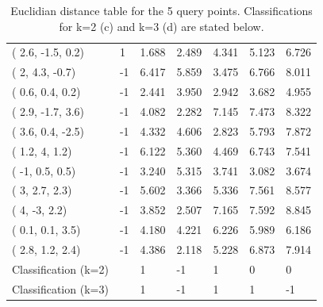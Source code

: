 \documentclass[12pt]{article}
\begin{document}
\begin{table}[h!]
\begin{tabular}{lllllll}
( 2.6, -1.5, 0.2)    & 1     & \cellcolor[HTML]{FFFE65}1.688 & \cellcolor[HTML]{FFCC67}2.489 & 4.341                         & 5.123                         & 6.726                         \\
( 2, 4.3, -0.7)      & -1    & 6.417                         & 5.859                         & 3.475                         & 6.766                         & 8.011                         \\
( 0.6, 0.4, 0.2)     & -1    & 2.441                         & 3.950                         & 2.942                         & 3.682                         & 4.955                         \\
( 2.9, -1.7, 3.6)    & -1    & 4.082                         & \cellcolor[HTML]{FFFE65}2.282 & 7.145                         & 7.473                         & 8.322                         \\
( 3.6, 0.4, -2.5)    & -1    & 4.332                         & 4.606                         & \cellcolor[HTML]{FFCC67}2.823 & 5.793                         & 7.872                         \\
( 1.2, 4, 1.2)       & -1    & 6.122                         & 5.360                         & 4.469                         & 6.743                         & 7.541                         \\
( -1, 0.5, 0.5)      & -1    & 3.240                         & 5.315                         & 3.741                         & 3.082                         & 3.674                         \\
( 3, 2.7, 2.3)       & -1    & 5.602                         & 3.366                         & 5.336                         & 7.561                         & 8.577                         \\
( 4, -3, 2.2)        & -1    & 3.852                         & 2.507                         & 7.165                         & 7.592                         & 8.845                         \\
( 0.1, 0.1, 3.5)     & -1    & 4.180                         & 4.221                         & 6.226                         & 5.989                         & 6.186                         \\
( 2.8, 1.2, 2.4)     & -1    & 4.386                         & \cellcolor[HTML]{FFFE65}2.118 & 5.228                         & 6.873                         & 7.914                         \\ \hline
Classification (k=2) &       & 1                             & -1                            & 1                             & 0                             & 0                             \\
Classification (k=3) &       & 1                             & -1                            & 1                             & 1                             & -1                           \\ \hline
\end{tabular}
\caption{Euclidian distance table for the 5 query points. Classifications for k=2 (c) and k=3 (d) are stated below.}
\end{table}
\clearpage
\end{document}

